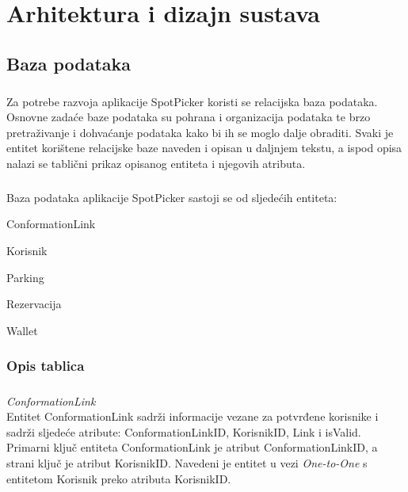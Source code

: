 \chapter{Arhitektura i dizajn sustava}

\section{Baza podataka}

\paragraph{}
{Za potrebe razvoja aplikacije SpotPicker koristi se relacijska baza podataka. 
Osnovne zadaće baze podataka su pohrana i organizacija podataka te brzo pretraživanje 
i dohvaćanje podataka kako bi ih se moglo dalje obraditi.
Svaki je entitet korištene relacijske baze naveden i opisan u daljnjem tekstu, 
a ispod opisa nalazi se tablični prikaz opisanog entiteta i njegovih atributa.}

\paragraph{}{Baza podataka aplikacije SpotPicker sastoji se od sljedećih entiteta:}
\begin{packed_item}
	\item ConformationLink
	\item Korisnik
	\item Parking
	\item Rezervacija
	\item Wallet
\end{packed_item}


\subsection{Opis tablica}

\paragraph{}
{\emph{ConformationLink\\}
Entitet ConformationLink sadrži informacije vezane za potvrđene korisnike i sadrži sljedeće atribute:
ConformationLinkID, KorisnikID, Link i isValid. Primarni ključ entiteta ConformationLink je atribut ConformationLinkID, a strani ključ je atribut KorisnikID.
Navedeni je entitet u vezi \emph{One-to-One} s entitetom Korisnik preko atributa KorisnikID.}

